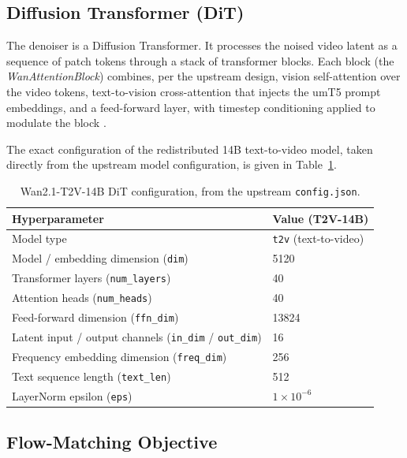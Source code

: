 \documentclass[11pt,a4paper]{article}
\begin{document}
\subsection{Diffusion Transformer (DiT)}

The denoiser is a Diffusion Transformer. It processes the noised video latent as a sequence of
patch tokens through a stack of transformer blocks. Each block (the \emph{WanAttentionBlock})
combines, per the upstream design, vision self-attention over the video tokens, text-to-vision
cross-attention that injects the umT5 prompt embeddings, and a feed-forward layer, with timestep
conditioning applied to modulate the block \cite{wan2025report}.

The exact configuration of the redistributed 14B text-to-video model, taken directly from the
upstream model configuration, is given in Table~\ref{tab:dit}.

\begin{table}[H]
\centering
\begin{tabular}{ll}
\toprule
\textbf{Hyperparameter} & \textbf{Value (T2V-14B)} \\
\midrule
Model type & \texttt{t2v} (text-to-video) \\
Model / embedding dimension (\texttt{dim}) & 5120 \\
Transformer layers (\texttt{num\_layers}) & 40 \\
Attention heads (\texttt{num\_heads}) & 40 \\
Feed-forward dimension (\texttt{ffn\_dim}) & 13824 \\
Latent input / output channels (\texttt{in\_dim} / \texttt{out\_dim}) & 16 \\
Frequency embedding dimension (\texttt{freq\_dim}) & 256 \\
Text sequence length (\texttt{text\_len}) & 512 \\
LayerNorm epsilon (\texttt{eps}) & $1\times10^{-6}$ \\
\bottomrule
\end{tabular}
\caption{Wan2.1-T2V-14B DiT configuration, from the upstream \texttt{config.json}.}
\label{tab:dit}
\end{table}

\subsection{Flow-Matching Objective}
\end{document}
